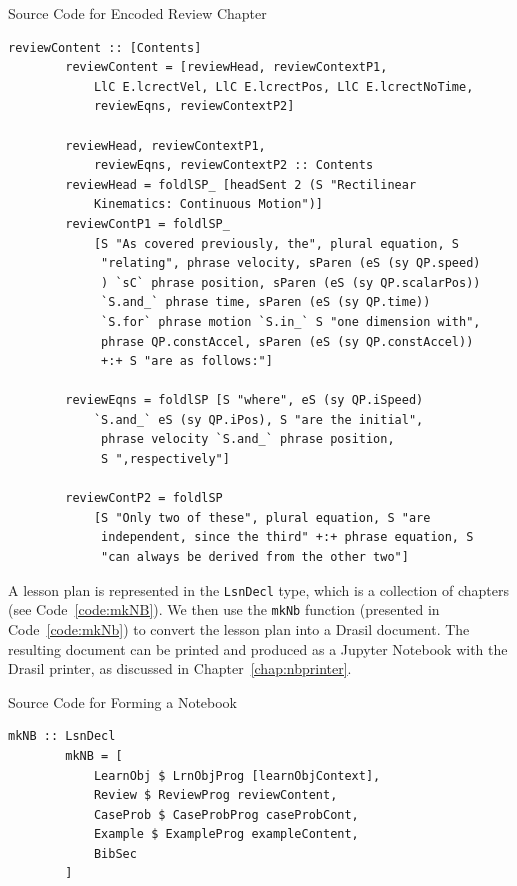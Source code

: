 \begin{listing}[h!]
	\caption{Source Code for Encoded Review Chapter} 
	\label{code:reviewContent}
	\begin{lstlisting}[language=haskell1]	
		reviewContent :: [Contents]
		reviewContent = [reviewHead, reviewContextP1, 
			LlC E.lcrectVel, LlC E.lcrectPos, LlC E.lcrectNoTime, 
			reviewEqns, reviewContextP2]
		
		reviewHead, reviewContextP1, 
			reviewEqns, reviewContextP2 :: Contents
		reviewHead = foldlSP_ [headSent 2 (S "Rectilinear 
			Kinematics: Continuous Motion")]
		reviewContP1 = foldlSP_
			[S "As covered previously, the", plural equation, S 
	 		 "relating", phrase velocity, sParen (eS (sy QP.speed)
	 		 ) `sC` phrase position, sParen (eS (sy QP.scalarPos)) 
	 		 `S.and_` phrase time, sParen (eS (sy QP.time)) 
	 		 `S.for` phrase motion `S.in_` S "one dimension with",
	 		 phrase QP.constAccel, sParen (eS (sy QP.constAccel)) 
	 		 +:+ S "are as follows:"]
		
		reviewEqns = foldlSP [S "where", eS (sy QP.iSpeed) 
			`S.and_` eS (sy QP.iPos), S "are the initial",
			 phrase velocity `S.and_` phrase position, 
			 S ",respectively"]
		
		reviewContP2 = foldlSP 
			[S "Only two of these", plural equation, S "are 
	 		 independent, since the third" +:+ phrase equation, S 
	 		 "can always be derived from the other two"]
	\end{lstlisting}
\end{listing}

A lesson plan is represented in the \texttt{LsnDecl} type, which is a 
collection of chapters (see Code~\ref{code:mkNB}). We then use the 
\texttt{mkNb} function (presented in Code~\ref{code:mkNb}) to convert the 
lesson plan into a Drasil document. The resulting document can be printed and 
produced as a Jupyter Notebook with the Drasil printer, as discussed in 
Chapter~\ref{chap:nbprinter}.

\begin{listing}[h!]
	\caption{Source Code for Forming a Notebook} 
	\label{code:mkNB}
	\begin{lstlisting}[language=haskell1]				
		mkNB :: LsnDecl
		mkNB = [
			LearnObj $ LrnObjProg [learnObjContext],
			Review $ ReviewProg reviewContent,
			CaseProb $ CaseProbProg caseProbCont,
			Example $ ExampleProg exampleContent,
			BibSec
		]
	\end{lstlisting}
\end{listing}

